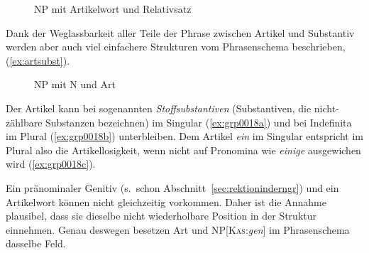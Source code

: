 \begin{figure}[!htbp]
  \centering
  \caption{NP mit Artikelwort und Relativsatz}
  \label{fig:grp7000}
\end{figure}

Dank der Weglassbarkeit aller Teile der Phrase zwischen Artikel und Substantiv werden aber auch viel einfachere Strukturen vom Phrasenschema beschrieben, \zB (\ref{ex:artsubst}).

\begin{exe}
\end{exe}

\begin{figure}[!htbp]
  \centering
  \caption{NP mit N und Art}
  \label{fig:artsubst}
\end{figure}


Der Artikel kann bei sogenannten \textit{Stoffsubstantiven} (Substantiven, die nicht-zählbare Substanzen bezeichnen) im Singular (\ref{ex:grp0018a}) und bei Indefinita im Plural (\ref{ex:grp0018b}) unterbleiben.
Dem Artikel \textit{ein} im Singular entspricht im Plural also die Artikellosigkeit, wenn nicht auf Pronomina wie \textit{einige} ausgewichen wird (\ref{ex:grp0018c}).

\begin{exe}
  \ex\label{ex:grp0018} 
  \begin{xlist}
  \end{xlist}
\end{exe}

Ein pränominaler Genitiv (s.\ schon Abschnitt~\ref{sec:rektioninderngr}) und ein Artikelwort können nicht gleichzeitig vorkommen.
Daher ist die Annahme plausibel, dass sie dieselbe nicht wiederholbare Position in der Struktur einnehmen.
Genau deswegen besetzen Art und NP[\textsc{Kas}:\textit{gen}] im Phrasenschema dasselbe Feld.

